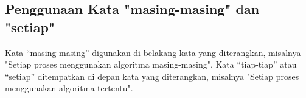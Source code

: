 \subsection{Penggunaan Kata "masing-masing" dan "setiap"}
Kata “masing-masing” digunakan di belakang kata yang diterangkan, misalnya 
"Setiap proses menggunakan algoritma masing-masing". Kata “tiap-tiap” atau “setiap”
ditempatkan di depan kata yang diterangkan, misalnya
"Setiap proses menggunakan algoritma tertentu".
